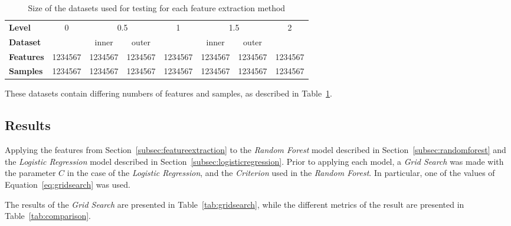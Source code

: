\begin{table}
\centering
\begin{tabular}{>{\bfseries}l c c c c c c c}
\toprule
\textbf{Level} & 0 & \multicolumn{2}{c}{0.5} & 1 & \multicolumn{2}{c}{1.5} & 2 \\
\cmidrule(lr){3-4} \cmidrule(lr){6-7}
\textbf{Dataset} &   & inner     &    outer    &   & inner     &    outer    &   \\
\midrule
Features &\num{1234567}&\num{1234567}&\num{1234567}&\num{1234567}&\num{1234567}&\num{1234567}&\num{1234567}\\
Samples  &\num{1234567}&\num{1234567}&\num{1234567}&\num{1234567}&\num{1234567}&\num{1234567}&\num{1234567}\\
\bottomrule
\end{tabular}
\caption{Size of the datasets used for testing for each feature extraction method}
\label{tab:datasettable}
\end{table}

These datasets contain differing numbers of features and samples, as described in Table~\ref{tab:datasettable}.

\subsection{Results}

Applying the features from Section~\ref{subsec:featureextraction} to the \emph{Random Forest} model described in Section~\ref{subsec:randomforest} and the \emph{Logistic Regression} model described in Section~\ref{subsec:logisticregression}. Prior to applying each model, a \emph{Grid Search} was made with the parameter $C$ in the case of the \emph{Logistic Regression}, and the \emph{Criterion} used in the \emph{Random Forest}. In particular, one of the values of Equation~\ref{eq:gridsearch} was used.

The results of the \emph{Grid Search} are presented in Table~\ref{tab:gridsearch}, while the different metrics of the result are presented in Table~\ref{tab:comparison}.

